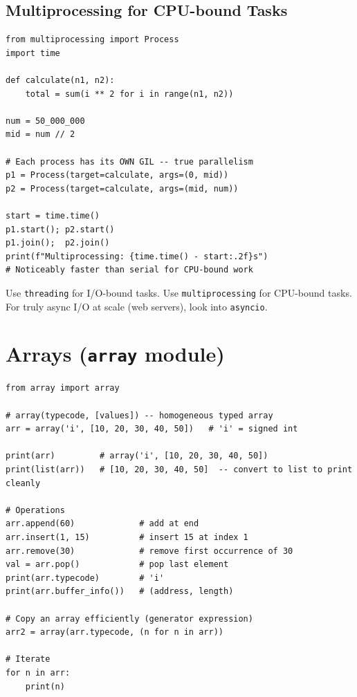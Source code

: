 \documentclass[12pt,a4paper]{article}
\newcommand{\code}[1]{\texttt{\small\color{pyblue}#1}}
\begin{document}
\subsection{Multiprocessing for CPU-bound Tasks}

\begin{lstlisting}
from multiprocessing import Process
import time

def calculate(n1, n2):
    total = sum(i ** 2 for i in range(n1, n2))

num = 50_000_000
mid = num // 2

# Each process has its OWN GIL -- true parallelism
p1 = Process(target=calculate, args=(0, mid))
p2 = Process(target=calculate, args=(mid, num))

start = time.time()
p1.start(); p2.start()
p1.join();  p2.join()
print(f"Multiprocessing: {time.time() - start:.2f}s")
# Noticeably faster than serial for CPU-bound work
\end{lstlisting}

\begin{tipbox}
Use \code{threading} for I/O-bound tasks. Use \code{multiprocessing} for CPU-bound tasks. For truly async I/O at scale (web servers), look into \code{asyncio}.
\end{tipbox}

\section{Arrays (\texttt{array} module)}

\begin{lstlisting}
from array import array

# array(typecode, [values]) -- homogeneous typed array
arr = array('i', [10, 20, 30, 40, 50])   # 'i' = signed int

print(arr)         # array('i', [10, 20, 30, 40, 50])
print(list(arr))   # [10, 20, 30, 40, 50]  -- convert to list to print cleanly

# Operations
arr.append(60)             # add at end
arr.insert(1, 15)          # insert 15 at index 1
arr.remove(30)             # remove first occurrence of 30
val = arr.pop()            # pop last element
print(arr.typecode)        # 'i'
print(arr.buffer_info())   # (address, length)

# Copy an array efficiently (generator expression)
arr2 = array(arr.typecode, (n for n in arr))

# Iterate
for n in arr:
    print(n)
\end{lstlisting}
\end{document}
